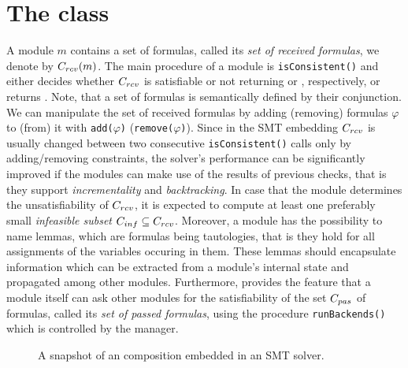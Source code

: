 \section{The \moduleClass class} A module $m$ contains a set of
formulas, called its \emph{set of received formulas}, we denote by 
$C_{rcv}(m)$. The main
procedure of a module is \texttt{isConsistent()} and either decides
whether $C_{rcv}$ is satisfiable or not returning \SAT or \UNSAT,
respectively, or returns \UNKNOWN. Note, that a set of formulas is
semantically defined by their conjunction. We can manipulate the set
of received formulas by adding (removing) formulas $\varphi$ to (from)
it with \texttt{add($\varphi$)} (\texttt{remove($\varphi$)}). Since in
the SMT embedding $C_{rcv}$ is usually changed between two consecutive
\texttt{isConsistent()} calls only by adding/removing constraints, the
solver's performance can be significantly improved if the modules can
make use of the results of previous checks, that is they support
\emph{incrementality} and \emph{backtracking}. In case that the module
determines the unsatisfiability of $C_{rcv}$, it is expected to compute
at least one preferably small \emph{infeasible subset} $C_{inf}\subseteq
C_{rcv}$. Moreover, a module has the possibility to name lemmas, which
are formulas being tautologies, that is they hold for all assignments
of the variables occuring in them. These lemmas should encapsulate
information which can be extracted from a module's internal state and
propagated among other \smtrat modules. Furthermore, \smtrat provides
the feature that a module itself can ask other modules for the
satisfiability of the set $C_{pas}$ of formulas, called its \emph{set
of passed formulas}, using the procedure \texttt{runBackends()} which
is controlled by the manager. 

\begin{figure}[t]
\caption{A snapshot of an \smtrat composition embedded in an SMT solver.}
\begin{center}

\end{center}
\label{fig:framework}
\end{figure}

